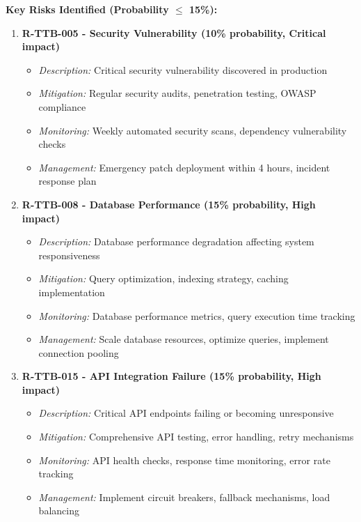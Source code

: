 \textbf{Key Risks Identified (Probability $\leq$ 15\%):}

\begin{enumerate}[leftmargin=*]
    \item \textbf{R-TTB-005 - Security Vulnerability (10\% probability, Critical impact)}
    \begin{itemize}
        \item \textit{Description:} Critical security vulnerability discovered in production
        \item \textit{Mitigation:} Regular security audits, penetration testing, OWASP compliance
        \item \textit{Monitoring:} Weekly automated security scans, dependency vulnerability checks
        \item \textit{Management:} Emergency patch deployment within 4 hours, incident response plan
    \end{itemize}
    
    \item \textbf{R-TTB-008 - Database Performance (15\% probability, High impact)}
    \begin{itemize}
        \item \textit{Description:} Database performance degradation affecting system responsiveness
        \item \textit{Mitigation:} Query optimization, indexing strategy, caching implementation
        \item \textit{Monitoring:} Database performance metrics, query execution time tracking
        \item \textit{Management:} Scale database resources, optimize queries, implement connection pooling
    \end{itemize}
    
    \item \textbf{R-TTB-015 - API Integration Failure (15\% probability, High impact)}
    \begin{itemize}
        \item \textit{Description:} Critical API endpoints failing or becoming unresponsive
        \item \textit{Mitigation:} Comprehensive API testing, error handling, retry mechanisms
        \item \textit{Monitoring:} API health checks, response time monitoring, error rate tracking
        \item \textit{Management:} Implement circuit breakers, fallback mechanisms, load balancing
    \end{itemize}
    

\end{enumerate}
